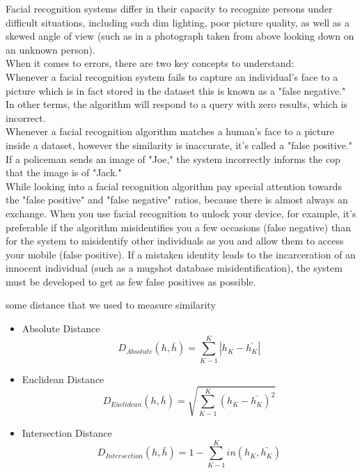 \documentclass[pdftex,10pt,a4paper,oneside]{article}
\begin{document}
Facial recognition systems differ in their capacity to recognize persons under difficult situations, including such dim lighting, poor picture quality, as well as a skewed angle of view (such as in a photograph taken from above looking down on an unknown person).\\
When it comes to errors, there are two key concepts to understand: \\
Whenever a facial recognition system fails to capture an individual's face to a picture which is in fact stored in the dataset this is known as a "false negative." In other terms, the algorithm will respond to a query with zero results, which is incorrect.\\
Whenever a facial recognition algorithm matches a human's face to a picture inside a dataset, however the similarity is inaccurate, it's called a "false positive." If a policeman sends an image of "Joe," the system incorrectly informs the cop that the image is of "Jack."\\
While looking into a facial recognition algorithm pay special attention towards the "false positive" and "false negative" ratios, because there is almost always an exchange. When you use facial recognition to unlock your device, for example, it's preferable if the algorithm misidentifies you a few occasions (false negative) than for the system to misidentify other individuals as you and allow them to access your mobile (false positive). If a mistaken identity leads to the incarceration of an innocent individual (such as a mugshot database misidentification), the system must be developed to get as few false positives as possible.

some distance that we used to measure similarity 
\begin{itemize}
	\item Absolute Distance \\
	\begin{equation}
		D_{Absolute}(h,\bar{h})= \sum_{K-1}^{K} |h_{K}-\bar{h_{K}}|
	\end{equation}
	\item Euclidean Distance \\
	\begin{equation}
		D_{Euclidean}(h,\bar{h})= \sqrt{\sum_{K-1}^{K} (h_{K}-\bar{h_{K}})^{2}}
	\end{equation}
	\item Intersection Distance \\
	\begin{equation}
	D_{Intersection}(h,\bar{h})= 1- \sum_{K-1}^{K} in(h_{K},\bar{h_{K}})
	\end{equation}
	
	
	
\end{itemize}
\end{document}
